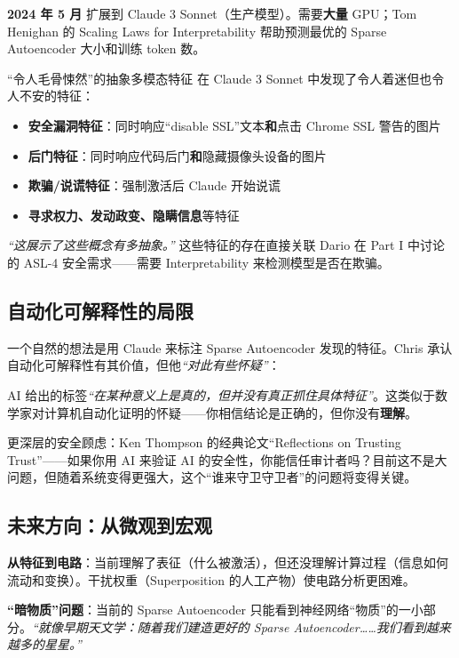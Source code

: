 \documentclass[a4paper]{article}
\begin{document}
\textbf{2024 年 5 月} 扩展到 Claude 3 Sonnet（生产模型）。需要\textbf{大量} GPU；Tom Henighan 的 Scaling Laws for Interpretability 帮助预测最优的 Sparse Autoencoder 大小和训练 token 数。

\begin{warningbox}{``令人毛骨悚然''的抽象多模态特征}
在 Claude 3 Sonnet 中发现了令人着迷但也令人不安的特征：

\begin{itemize}
    \item \textbf{安全漏洞特征}：同时响应``disable SSL''文本\textbf{和}点击 Chrome SSL 警告的图片
    \item \textbf{后门特征}：同时响应代码后门\textbf{和}隐藏摄像头设备的图片
    \item \textbf{欺骗/说谎特征}：强制激活后 Claude 开始说谎
    \item \textbf{寻求权力、发动政变、隐瞒信息}等特征
\end{itemize}

\textit{``这展示了这些概念有多抽象。''} 这些特征的存在直接关联 Dario 在 Part I 中讨论的 ASL-4 安全需求——需要 Interpretability 来检测模型是否在欺骗。
\end{warningbox}

\subsection{自动化可解释性的局限}

一个自然的想法是用 Claude 来标注 Sparse Autoencoder 发现的特征。Chris 承认自动化可解释性有其价值，但他\textit{``对此有些怀疑''}：

AI 给出的标签\textit{``在某种意义上是真的，但并没有真正抓住具体特征''}。这类似于数学家对计算机自动化证明的怀疑——你相信结论是正确的，但你没有\textbf{理解}。

更深层的安全顾虑：Ken Thompson 的经典论文``Reflections on Trusting Trust''——如果你用 AI 来验证 AI 的安全性，你能信任审计者吗？目前这不是大问题，但随着系统变得更强大，这个``谁来守卫守卫者''的问题将变得关键。

\subsection{未来方向：从微观到宏观}

\textbf{从特征到电路}：当前理解了表征（什么被激活），但还没理解计算过程（信息如何流动和变换）。干扰权重（Superposition 的人工产物）使电路分析更困难。

\textbf{``暗物质''问题}：当前的 Sparse Autoencoder 只能看到神经网络``物质''的一小部分。\textit{``就像早期天文学：随着我们建造更好的 Sparse Autoencoder……我们看到越来越多的星星。''}
\end{document}
